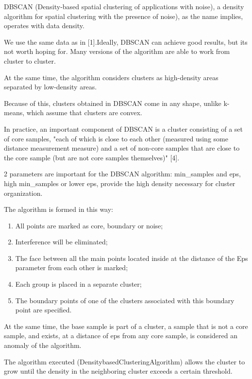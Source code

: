 DBSCAN (Density-based spatial clustering of applications with noise), a
density algorithm for spatial clustering with the presence of noise), as
the name implies, operates with data density.

We use the same data as in {[}1{]}.Ideally, DBSCAN can achieve good
results, but it\textquotesingle s not worth hoping for. Many versions of
the algorithm are able to work from cluster to cluster.

At the same time, the algorithm considers clusters as high-density areas
separated by low-density areas.

Because of this, clusters obtained in DBSCAN come in any shape, unlike
k-means, which assume that clusters are convex.

In practice, an important component of DBSCAN is a cluster consisting of
a set of core samples, "each of which is close to each other (measured
using some distance measurement measure) and a set of non-core samples
that are close to the core sample (but are not core samples themselves)"
{[}4{]}.

2 parameters are important for the DBSCAN algorithm: min\_samples and
eps, high min\_samples or lower eps, provide the high density necessary
for cluster organization.

The algorithm is formed in this way:

\begin{enumerate}
\item
All points are marked as core, boundary or noise;

\item
Interference will be eliminated;

\item
The face between all the main points located inside at the distance
of the Eps parameter from each other is marked;

\item
Each group is placed in a separate cluster;

\item
The boundary points of one of the clusters associated with this
boundary point are specified.
\end{enumerate}

At the same time, the base sample is part of a cluster, a sample that is
not a core sample, and exists, at a distance of eps from any core
sample, is considered an anomaly of the algorithm.

The algorithm executed (DensitybasedClusteringAlgorithm) allows the
cluster to grow until the density in the neighboring cluster exceeds a
certain threshold.

